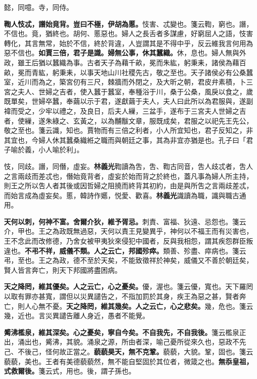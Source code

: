 \begin{quoting}懿，同噫。寺，同侍。\end{quoting}

\textbf{鞫人忮忒，譖始竟背。豈曰不極，伊胡為慝。}{\footnotesize 忮害、忒變也。箋云鞫，窮也。譖，不信也。竟，猶終也。胡何、慝惡也。婦人之長舌者多謀慮，好窮屈人之語，忮害轉化，其言無常，始於不信，終於背違，人豈謂其是不得中乎，反云維我言何用為惡不信也。}\textbf{如賈三倍，君子是識。婦無公事，休其蠶織。}{\footnotesize 休，息也。婦人無與外政，雖王后猶以蠶織為事。古者天子為藉千畝，冕而朱紘，躬秉耒，諸侯為藉百畝，冕而青紘，躬秉耒，以事天地山川社稷先古，敬之至也。天子諸侯必有公桑蠶室，近川而為之，築宮仞有三尺，棘牆而外閉之，及大昕之朝，君皮弁素積，卜三宮之夫人、世婦之吉者，使入蠶于蠶室，奉種浴于川，桑于公桑，風戾以食之，歲既單矣，世婦卒蠶，奉繭以示于君，遂獻繭于夫人，夫人曰此所以為君服與，遂副褘而受之，少牢以禮之，及良日，后夫人繅，三盆手，遂布于三宮夫人世婦之吉者，使繅，遂朱綠之、玄黃之，以為黼黻文章，服既成矣，君服之以祀先王先公，敬之至也。箋云識，知也。賈物而有三倍之利者，小人所宜知也，君子反知之，非其宜也，今婦人休其蠶桑織絍之職而與朝廷之事，其為非宜亦猶是也。孔子曰「君子喻於義，小人喻於利」。}

\begin{quoting}忮，同歧。譖，同僭，虛妄。\textbf{林義光}鞫讀為吿，吿、鞫古同音，吿人歧忒者，吿人之言兩歧而差忒也，僭始竟背者，虛妄於始而背之於終也，蓋凡事為婦人所主持，則王之所以吿人者其後或因哲婦之阻撓而終背其初約，由是與所吿之言兩歧差忒，而始言成為虛妄矣。慝，韓詩作嬺，悦愛、歡喜。\textbf{林義光}識讀為職，識與職古通用。\end{quoting}

\textbf{天何以刺，何神不富。舍爾介狄，維予胥忌。}{\footnotesize 刺責、富福、狄遠、忌怨也。箋云介，甲也。王之為政既無過惡，天何以責王見變異乎，神何以不福王而有災害也，王不念此而改修德，乃舍女被甲夷狄來侵犯中國者，反與我相怨，謂其疾怨群臣叛違也。}\textbf{不弔不祥，威儀不類。人之云亡，邦國殄瘁。}{\footnotesize 類善、殄盡、瘁病也。箋云弔，至也。王之為政，德不至於天矣，不能致徵祥於神矣，威儀又不善於朝廷矣，賢人皆言奔亡，則天下邦國將盡困病。}

\textbf{天之降罔，維其優矣。人之云亡，心之憂矣。}{\footnotesize 優，渥也。箋云優，寬也。天下羅罔以取有罪亦甚寬，謂但以災異譴告之，不指加罰於其身，疾王為惡之甚，賢者奔亡，則人心無不憂。}\textbf{天之降罔，維其幾矣。人之云亡，心之悲矣。}{\footnotesize 幾，危也。箋云幾，近也。言災異譴告離人身近，愚者不能覺。}

\textbf{觱沸檻泉，維其深矣。心之憂矣，寧自今矣。不自我先，不自我後。}{\footnotesize 箋云檻泉正出，涌出也，觱沸，其貌。涌泉之源，所由者深，喻己憂所從來久也，惡政不先己、不後己，怪何故正當之。}\textbf{藐藐昊天，無不克鞏。}{\footnotesize 藐藐，大貌。鞏，固也。箋云藐藐，美也。王者有美德藐藐然，無不能自堅固於其位者，微箴之也。}\textbf{無忝皇祖，式救爾後。}{\footnotesize 箋云式，用也。後，謂子孫也。}


